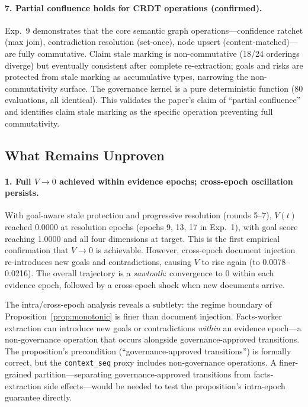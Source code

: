 \documentclass[11pt]{article}
\begin{document}
\paragraph{7. Partial confluence holds for CRDT operations (confirmed).} Exp.~9 demonstrates that the core semantic graph operations---confidence ratchet (max join), contradiction resolution (set-once), node upsert (content-matched)---are fully commutative. Claim stale marking is non-commutative (18/24 orderings diverge) but eventually consistent after complete re-extraction; goals and risks are protected from stale marking as accumulative types, narrowing the non-commutativity surface. The governance kernel is a pure deterministic function (80 evaluations, all identical). This validates the paper's claim of ``partial confluence'' and identifies claim stale marking as the specific operation preventing full commutativity.

\subsection{What Remains Unproven}

\paragraph{1. Full $V \to 0$ achieved within evidence epochs; cross-epoch oscillation persists.} With goal-aware stale protection and progressive resolution (rounds 5--7), $V(t)$ reached 0.0000 at resolution epochs (epochs 9, 13, 17 in Exp.~1), with goal score reaching 1.0000 and all four dimensions at target. This is the first empirical confirmation that $V \to 0$ is achievable. However, cross-epoch document injection re-introduces new goals and contradictions, causing $V$ to rise again (to 0.0078--0.0216). The overall trajectory is a \emph{sawtooth}: convergence to 0 within each evidence epoch, followed by a cross-epoch shock when new documents arrive.

The intra/cross-epoch analysis reveals a subtlety: the regime boundary of Proposition~\ref{prop:monotonic} is finer than document injection. Facts-worker extraction can introduce new goals or contradictions \emph{within} an evidence epoch---a non-governance operation that occurs alongside governance-approved transitions. The proposition's precondition (``governance-approved transitions'') is formally correct, but the \texttt{context\_seq} proxy includes non-governance operations. A finer-grained partition---separating governance-approved transitions from facts-extraction side effects---would be needed to test the proposition's intra-epoch guarantee directly.
\end{document}
